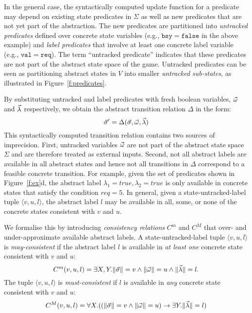 In the general case, the syntactically computed update function 
for a predicate may depend on existing state predicates in 
$\Sigma$ as well as new predicates that are not yet part of the 
abstraction.  The new predicates are partitioned into 
\emph{untracked predicates} defined over concrete state variables 
(e.g., $\mathtt{bsy=false}$ in the above example) and \emph{label 
predicates} that involve at least one concrete label variable 
(e.g., $\mathtt{val=req}$).  The term ``untracked predicate'' 
indicates that these predicates are not part of the 
abstract state space of the game.  Untracked predicates can be 
seen as partitioning abstract states in $V$ into smaller 
\emph{untracked sub-states}, as illustrated in 
Figure~\ref{f:predicates}.

By substituting untracked and label predicates with fresh boolean 
variables, $\vec{\omega}$ and $\vec{\lambda}$ respectively, we 
obtain the abstract transition relation $\Delta$ in the form:
$$
\vec{\sigma}'=\Delta(\vec{\sigma},\vec{\omega},\vec{\lambda})
$$
This syntactically computed transition relation contains two 
sources of imprecision.  First, untracked variables 
$\vec{\omega}$ are not part of the abstract state space $\Sigma$ 
and are therefore treated as external inputs.  
Second, not all abstract labels  
are available in all abstract states and hence 
not all transitions in $\Delta$ correspond to a feasible concrete 
transition.  For example, given the set of predicates shown in 
Figure~\ref{f:ex}d, the abstract label $\lambda_1 = true, 
\lambda_2 = true$ is only available in concrete states that 
satisfy the condition $req=5$.  In general, given a 
state-untracked-label tuple $\langle v,u,l\rangle$, the abstract 
label $l$ may be available in all, some, or none of the concrete 
states consistent with $v$ and $u$.  

We formalise this by introducing \emph{consistency relations} 
$C^m$ and $C^M$ that over- and under-approximate available 
abstract labels.  A state-untracked-label tuple $\langle 
v,u,l\rangle$ is \emph{may-consistent} if the abstract label $l$ 
is available in \emph{at least one} concrete state consistent with 
$v$ and $u$:
\begin{equation} \label{e:Cm}
    \small
    C^m(v,u,l) = \exists X,Y. \|\vec{\sigma}\|=v \land \|\vec{\omega}\|=u \land \|\vec{\lambda}\|=l.
\end{equation}
The tuple $\langle v,u,l\rangle$ is \emph{must-consistent} if $l$ 
is available in \emph{any} concrete state consistent with $v$ and 
$u$:
\begin{equation}
    \small
    C^M(v,u,l) = \forall X . ((\|\vec{\sigma}\|=v \land \|\vec{\omega}\|=u) \rightarrow \exists Y.  \|\vec{\lambda}\|=l)
\end{equation}

